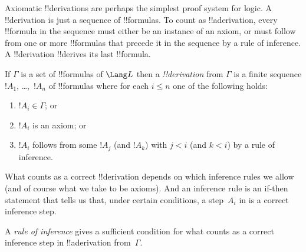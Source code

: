 \documentclass[../../include/open-logic-section]{subfiles}
\begin{document}


\begin{explain}
  Axiomatic !!{derivation}s are perhaps the simplest proof system for
  logic. A !!{derivation} is just a sequence of !!{formula}s.  To
  count as !!a{derivation}, every !!{formula} in the sequence must
  either be an instance of an axiom, or must follow from one or more
  !!{formula}s that precede it in the sequence by a rule of inference.
  A !!{derivation} !!{derive}s its last !!{formula}.
\end{explain}

\begin{defn}[!!^{derivability}]
If $\Gamma$ is a set of !!{formula}s of $\Lang L$ then a
\emph{!!{derivation}} from $\Gamma$ is a finite sequence $!A_1$,
\dots,~$!A_n$ of !!{formula}s where for each $i \le n$ one of the
following holds:
\begin{enumerate}
\item $!A_i \in \Gamma$; or
\item $!A_i$ is an axiom; or
\item $!A_i$ follows from some $!A_j$ (and $!A_k$) with $j < i$ (and $k < i$)
  by a rule of inference.
\end{enumerate}
\end{defn}

What counts as a correct !!{derivation} depends on which inference
rules we allow (and of course what we take to be axioms).  And an
inference rule is an if-then statement that tells us that, under
certain conditions, a step~$A_i$ in is a correct inference step.

\begin{defn}
A \emph{rule of inference} gives a sufficient condition for what
counts as a correct inference step in !!a{derivation} from~$\Gamma$.
\end{defn}
\end{document}
